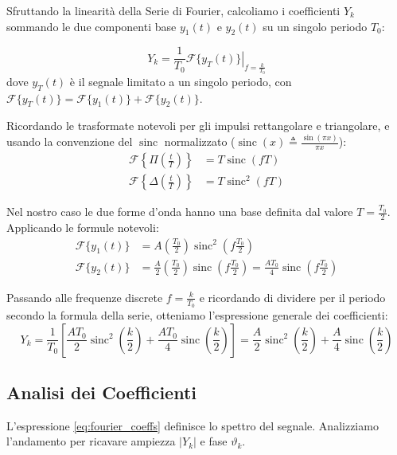 Sfruttando la linearità della Serie di Fourier, calcoliamo i coefficienti $Y_k$ sommando le due componenti base $y_1(t)$ e $y_2(t)$ su un singolo periodo $T_0$:

\[ Y_k = \frac{1}{T_0} \left. \mathcal{F}\{y_T(t)\} \right|_{f=\frac{k}{T_0}} \]
dove $y_T(t)$ è il segnale limitato a un singolo periodo, con $\mathcal{F}\{y_T(t)\} = \mathcal{F}\{y_1(t)\} + \mathcal{F}\{y_2(t)\}$.

Ricordando le trasformate notevoli per gli impulsi rettangolare e triangolare, e usando la convenzione del $\operatorname{sinc}$ normalizzato ($\operatorname{sinc}(x) \triangleq \frac{\sin(\pi x)}{\pi x}$):
\begin{align}
    \mathcal{F}\left\{ \Pi\left(\frac{t}{T}\right) \right\}    & = T \operatorname{sinc}(f T)   \\
    \mathcal{F}\left\{ \Delta\left(\frac{t}{T}\right) \right\} & = T \operatorname{sinc}^2(f T)
\end{align}

Nel nostro caso le due forme d'onda hanno una base definita dal valore $T = \frac{T_0}{2}$. Applicando le formule notevoli:
\begin{align}
    \mathcal{F}\{ y_1(t) \} & = A \left(\frac{T_0}{2}\right) \operatorname{sinc}^2\left(f \frac{T_0}{2}\right)                                                                           \\
    \mathcal{F}\{ y_2(t) \} & = \frac{A}{2} \left(\frac{T_0}{2}\right) \operatorname{sinc}\left(f \frac{T_0}{2}\right) = \frac{A T_0}{4} \operatorname{sinc}\left(f \frac{T_0}{2}\right)
\end{align}

Passando alle frequenze discrete $f = \frac{k}{T_0}$ e ricordando di dividere per il periodo secondo la formula della serie, otteniamo l'espressione generale dei coefficienti:
\begin{equation}
    Y_k = \frac{1}{T_0} \left[ \frac{A T_0}{2} \operatorname{sinc}^2\left(\frac{k}{2}\right) + \frac{A T_0}{4} \operatorname{sinc}\left(\frac{k}{2}\right) \right] = \frac{A}{2} \operatorname{sinc}^2\left(\frac{k}{2}\right) + \frac{A}{4} \operatorname{sinc}\left(\frac{k}{2}\right) \label{eq:fourier_coeffs}
\end{equation}

\subsection{Analisi dei Coefficienti}
L'espressione \eqref{eq:fourier_coeffs} definisce lo spettro del segnale. Analizziamo l'andamento per ricavare ampiezza $|Y_k|$ e fase $\vartheta_k$.

